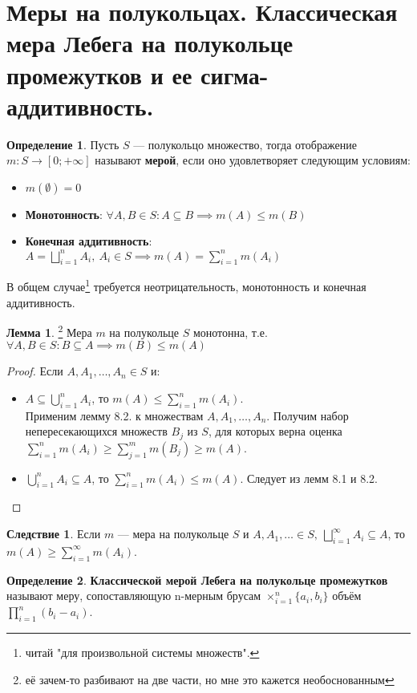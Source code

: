 \documentclass[11pt,a4paper]{report}
\theoremstyle{definition}
\theoremstyle{definition}
\newtheorem{lemma}{Лемма}[section]
\newtheorem{corollary}{Следствие}[section]
\theoremstyle{definition}
\newtheorem{definition}{Определение}[section]
\begin{document}
	\section{Меры на полукольцах. Классическая мера Лебега на полукольце промежутков и ее сигма-аддитивность.}
	\begin{definition}
	Пусть $ S $ — полукольцо множество, тогда отображение $ m: S \to [0; +\infty]$ называют \textbf{мерой}, если оно удовлетворяет следующим условиям:
	\begin{itemize}
		\item $ m(\emptyset) = 0 $
		\item \textbf{Монотонность}: $ \forall A, B \in S: A \subseteq B \implies m(A) \le m(B) $
		\item \textbf{Конечная аддитивность}: $ A = \bigsqcup\limits_{i=1}^{n} A_{i},\ A_{i} \in S \implies m(A) = \sum\limits_{i=1}^{n} m(A_{i}) $
	\end{itemize}
	В общем случае\footnote{читай "для произвольной системы множеств".} требуется неотрицательность, монотонность и конечная аддитивность.
	\end{definition}
	\begin{lemma}\footnote{её зачем-то разбивают на две части, но мне это кажется необоснованным}
		Мера $ m $ на полукольце $ S $ монотонна, т.е. $ \forall A, B \in S: B \subseteq A \implies m(B) \le m(A) $
	\end{lemma}
	\begin{proof}
		Если $ A, A_{1}, \dots, A_{n} \in S $ и:
		\begin{itemize}
			\item $ A \subseteq \bigcup_{i=1}^{n}{A_{i}} $, то $ m(A) \le \sum_{i=1}^{n}{m(A_{i})} $.\\ 
			Применим лемму 8.2. к множествам $ A, A_{1}, \dots, A_{n} $. Получим набор непересекающихся множеств $ B_{j} $ из $ S $, для которых верна оценка $ \sum_{i=1}^{n}{m(A_{i})} \ge \sum_{j=1}^{m}{m(B_{j})}  \ge m(A) $.
			\item $ \bigcup_{i=1}^{n}{A_{i}} \subseteq A $, то $ \sum_{i=1}^{n}{m(A_{i})} \le m(A) $. Следует из лемм 8.1 и 8.2.
		\end{itemize}
	\end{proof}
	\begin{corollary}
		Если $ m $ — мера на полукольце $ S $ и $ A, A_{1}, \ldots \in S,\ \bigsqcup_{i=1}^{\infty}{A_{i}} \subseteq A $, то $ m(A) \ge \sum_{i=1}^{\infty}{m(A_{i})} $. 
	\end{corollary}
	\begin{definition}
		\textbf{Классической мерой Лебега на полукольце промежутков} называют меру, сопоставляющую n-мерным брусам $ \times_{i=1}^{n} \{a_{i}, b_{i}\} $ объём $ \prod_{i=1}^{n}{(b_{i} - a_{i})} $.
	\end{definition}
\end{document}
